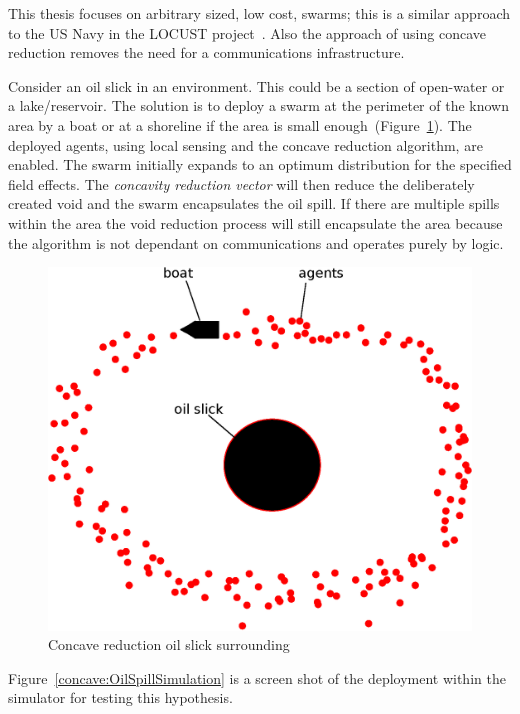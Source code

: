 This thesis focuses on arbitrary sized, low cost, swarms; this is a similar approach to the US Navy in the LOCUST project~\cite{MW:15, DS:15}. Also the approach of using concave reduction removes the need for a communications infrastructure. 

Consider an oil slick in an environment. This could be a section of open-water or a lake/reservoir. The solution is to deploy a swarm at the perimeter of the known area by a boat or at a shoreline if the area is small enough~(Figure~\ref{voids:OilSlick}). The deployed agents, using local sensing and the concave reduction algorithm, are enabled. The swarm initially expands to an optimum distribution for the specified field effects. The \textit{concavity reduction vector} will then reduce the deliberately created void and the swarm encapsulates the oil spill. If there are multiple spills within the area the void reduction process will still encapsulate the area because the algorithm is not dependant on communications and operates purely by logic.  

\begin{figure}[H]
\begin{center}
\includegraphics[width=12cm]{CHAPTER-7/figures/OilSlick}
\end{center}
\caption{Concave reduction oil slick surrounding\label{voids:OilSlick}}
\end{figure}

Figure~\ref{concave:OilSpillSimulation} is a screen shot of the deployment within the simulator for testing this hypothesis. 

